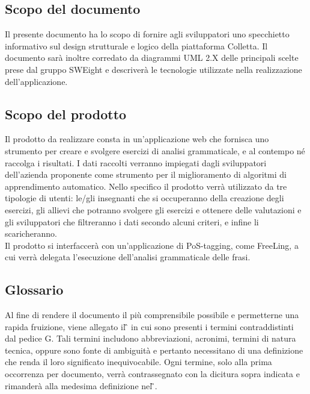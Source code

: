 \subsection{Scopo del documento}
Il presente documento ha lo scopo di fornire agli sviluppatori uno specchietto informativo sul design strutturale e logico della piattaforma Colletta. Il documento sarà inoltre
corredato da diagrammi UML 2.X delle principali scelte prese dal gruppo SWEight e descriverà le tecnologie utilizzate nella realizzazione dell’applicazione.
\subsection{Scopo del prodotto}
Il prodotto da realizzare consta in un’applicazione web che fornisca uno strumento per creare e svolgere esercizi di analisi grammaticale, e al contempo né raccolga i risultati. I dati raccolti verranno impiegati dagli sviluppatori dell’azienda proponente come strumento per il miglioramento di algoritmi di {apprendimento automatico}. Nello specifico il prodotto verrà utilizzato da tre tipologie di utenti:
le/gli insegnanti che si occuperanno della creazione degli esercizi,
gli allievi che potranno svolgere gli esercizi e ottenere delle valutazioni e gli sviluppatori che filtreranno i dati secondo alcuni criteri, e infine li scaricheranno.\\Il prodotto si interfaccerà con un’applicazione di {PoS-tagging}, come {FreeLing}, a cui verrà delegata l’esecuzione dell’analisi grammaticale delle frasi.
\subsection{Glossario}
Al fine di rendere il documento il più comprensibile possibile e permetterne una rapida fruizione, viene allegato il \G{} in cui sono presenti i termini contraddistinti dal pedice G. Tali termini includono abbreviazioni, acronimi, termini di natura tecnica, oppure sono fonte di ambiguità e pertanto necessitano di una definizione che renda il loro significato inequivocabile. 
Ogni termine, solo alla prima occorrenza per documento, verrà contrassegnato con la dicitura sopra indicata e rimanderà alla medesima definizione nel \G{}.
\newpage